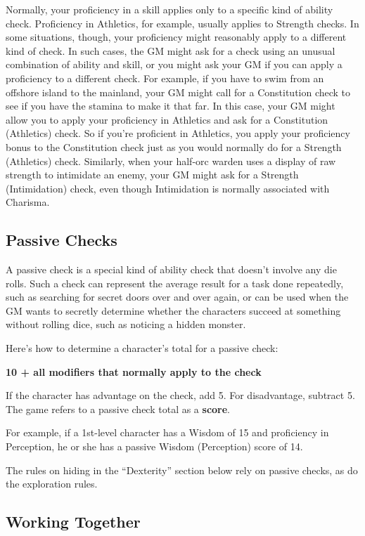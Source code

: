 Normally, your proficiency in a skill applies only to a specific kind of ability check. Proficiency in Athletics, for example, usually applies to Strength checks. In some situations, though, your proficiency might reasonably apply to a different kind of check. In such cases, the GM might ask for a check using an unusual combination of ability and skill, or you might ask your GM if you can apply a proficiency to a different check. For example, if you have to swim from an offshore island to the mainland, your GM might call for a Constitution check to see if you have the stamina to make it that far. In this case, your GM might allow you to apply your proficiency in Athletics and ask for a Constitution (Athletics) check. So if you're proficient in Athletics, you apply your proficiency bonus to the Constitution check just as you would normally do for a Strength (Athletics) check. Similarly, when your half-orc warden uses a display of raw strength to intimidate an enemy, your GM might ask for a Strength (Intimidation) check, even though Intimidation is normally associated with Charisma.

\subsection{Passive Checks}

A passive check is a special kind of ability check that doesn't involve any die rolls. Such a check can represent the average result for a task done repeatedly, such as searching for secret doors over and over again, or can be used when the GM wants to secretly determine whether the characters succeed at something without rolling dice, such as noticing a hidden monster.

Here's how to determine a character's total for a passive check:

\textbf{10 + all modifiers that normally apply to the check}

If the character has advantage on the check, add 5. For disadvantage, subtract 5. The game refers to a passive check total as a \textbf{score}.

For example, if a 1st-level character has a Wisdom of 15 and proficiency in Perception, he or she has a passive Wisdom (Perception) score of 14.

The rules on hiding in the “Dexterity” section below rely on passive checks, as do the exploration rules.

\subsection{Working Together}

